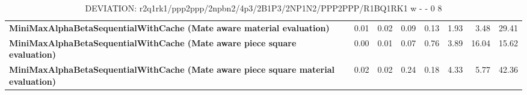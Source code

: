 \begin{table}[H]
{\begin{tabular}{|p{8cm}|*{7}{r|}}
            \rowcolor[HTML]{EFEFEF}
            \textbf{MiniMaxAlphaBetaSequentialWithCache (Mate aware material evaluation)}              & 0.01 & 0.02 & 0.09 & 0.13 & 1.93 & 3.48 & 29.41 \\
            \rowcolor[HTML]{FFFFFF}
            \textbf{MiniMaxAlphaBetaSequentialWithCache (Mate aware piece square evaluation)}               & 0.00 & 0.01 & 0.07 & 0.76 & 3.89 & 16.04 & 15.62 \\
            \rowcolor[HTML]{EFEFEF}
            \textbf{MiniMaxAlphaBetaSequentialWithCache (Mate aware piece square material evaluation)}               & 0.02 & 0.02 & 0.24 & 0.18 & 4.33 & 5.77 & 42.36 \\

            \hline
        \end{tabular}%
    }
    \caption{DEVIATION: r2q1rk1/ppp2ppp/2npbn2/4p3/2B1P3/2NP1N2/PPP2PPP/R1BQ1RK1 w - - 0 8}
    \label{tab:midgame-tactical-cluster-deviation}
\end{table}
